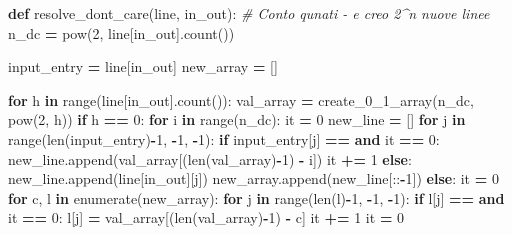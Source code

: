 \documentclass[
  italian,
]{book}
\newenvironment{Shaded}{\begin{snugshade}}{\end{snugshade}}
\newcommand{\BuiltInTok}[1]{#1}
\newcommand{\CommentTok}[1]{\textcolor[rgb]{0.56,0.35,0.01}{\textit{#1}}}
\newcommand{\ControlFlowTok}[1]{\textcolor[rgb]{0.13,0.29,0.53}{\textbf{#1}}}
\newcommand{\DecValTok}[1]{\textcolor[rgb]{0.00,0.00,0.81}{#1}}
\newcommand{\KeywordTok}[1]{\textcolor[rgb]{0.13,0.29,0.53}{\textbf{#1}}}
\newcommand{\NormalTok}[1]{#1}
\newcommand{\OperatorTok}[1]{\textcolor[rgb]{0.81,0.36,0.00}{\textbf{#1}}}
\newcommand{\StringTok}[1]{\textcolor[rgb]{0.31,0.60,0.02}{#1}}
\begin{document}
\begin{Shaded}
\begin{Highlighting}[]
\KeywordTok{def}\NormalTok{ resolve\_dont\_care(line, in\_out):}
    \CommentTok{\# Conto qunati {-} e creo 2\^{}n nuove linee}
\NormalTok{    n\_dc }\OperatorTok{=} \BuiltInTok{pow}\NormalTok{(}\DecValTok{2}\NormalTok{, line[in\_out].count(}\StringTok{\textquotesingle{}{-}\textquotesingle{}}\NormalTok{))}

\NormalTok{    input\_entry }\OperatorTok{=}\NormalTok{ line[in\_out]}
\NormalTok{    new\_array }\OperatorTok{=}\NormalTok{ []}

    \ControlFlowTok{for}\NormalTok{ h }\KeywordTok{in} \BuiltInTok{range}\NormalTok{(line[in\_out].count(}\StringTok{\textquotesingle{}{-}\textquotesingle{}}\NormalTok{)):}
\NormalTok{        val\_array }\OperatorTok{=}\NormalTok{ create\_0\_1\_array(n\_dc, }\BuiltInTok{pow}\NormalTok{(}\DecValTok{2}\NormalTok{, h))}
        \ControlFlowTok{if}\NormalTok{ h }\OperatorTok{==} \DecValTok{0}\NormalTok{:}
            \ControlFlowTok{for}\NormalTok{ i }\KeywordTok{in} \BuiltInTok{range}\NormalTok{(n\_dc):}
\NormalTok{                it }\OperatorTok{=} \DecValTok{0}
\NormalTok{                new\_line }\OperatorTok{=}\NormalTok{ []}
                \ControlFlowTok{for}\NormalTok{ j }\KeywordTok{in} \BuiltInTok{range}\NormalTok{(}\BuiltInTok{len}\NormalTok{(input\_entry)}\OperatorTok{{-}}\DecValTok{1}\NormalTok{, }\OperatorTok{{-}}\DecValTok{1}\NormalTok{, }\OperatorTok{{-}}\DecValTok{1}\NormalTok{):}
                    \ControlFlowTok{if}\NormalTok{ input\_entry[j] }\OperatorTok{==} \StringTok{\textquotesingle{}{-}\textquotesingle{}} \KeywordTok{and}\NormalTok{ it }\OperatorTok{==} \DecValTok{0}\NormalTok{:}
\NormalTok{                        new\_line.append(val\_array[(}\BuiltInTok{len}\NormalTok{(val\_array)}\OperatorTok{{-}}\DecValTok{1}\NormalTok{) }\OperatorTok{{-}}\NormalTok{ i])}
\NormalTok{                        it }\OperatorTok{+=} \DecValTok{1}
                    \ControlFlowTok{else}\NormalTok{:}
\NormalTok{                        new\_line.append(line[in\_out][j])}
\NormalTok{                new\_array.append(new\_line[::}\OperatorTok{{-}}\DecValTok{1}\NormalTok{])}
        \ControlFlowTok{else}\NormalTok{:}
\NormalTok{            it }\OperatorTok{=} \DecValTok{0}
            \ControlFlowTok{for}\NormalTok{ c, l }\KeywordTok{in} \BuiltInTok{enumerate}\NormalTok{(new\_array):}
                \ControlFlowTok{for}\NormalTok{ j }\KeywordTok{in} \BuiltInTok{range}\NormalTok{(}\BuiltInTok{len}\NormalTok{(l)}\OperatorTok{{-}}\DecValTok{1}\NormalTok{, }\OperatorTok{{-}}\DecValTok{1}\NormalTok{, }\OperatorTok{{-}}\DecValTok{1}\NormalTok{):}
                    \ControlFlowTok{if}\NormalTok{ l[j] }\OperatorTok{==} \StringTok{\textquotesingle{}{-}\textquotesingle{}} \KeywordTok{and}\NormalTok{ it }\OperatorTok{==} \DecValTok{0}\NormalTok{:}
\NormalTok{                        l[j] }\OperatorTok{=}\NormalTok{ val\_array[(}\BuiltInTok{len}\NormalTok{(val\_array)}\OperatorTok{{-}}\DecValTok{1}\NormalTok{) }\OperatorTok{{-}}\NormalTok{ c]}
\NormalTok{                        it }\OperatorTok{+=} \DecValTok{1}
\NormalTok{                it }\OperatorTok{=} \DecValTok{0}


\end{Highlighting}
\end{Shaded}
\end{document}
